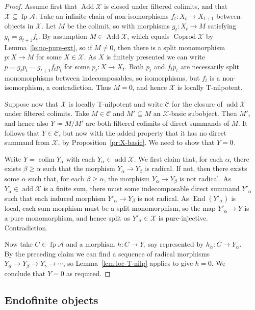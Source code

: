 \documentclass[a4paper]{amsart}
\theoremstyle{plain}
\theoremstyle{definition}
\theoremstyle{remark}
\numberwithin{equation}{section}
\newcommand{\add}{\operatorname{add}}
\newcommand{\Add}{\operatorname{Add}}
\newcommand{\Coprod}{\operatorname{Coprod}}
\newcommand{\colim}{\operatorname*{colim}}
\newcommand{\End}{\operatorname{End}}
\newcommand{\fp}{\operatorname{fp}}
\def\A{\mathcal A}
\def\X{\mathcal X}
\begin{document}
\begin{proof}
Assume first that $\Add\X$ is closed under filtered colimits, and that $\X\subseteq\fp\A$. Take an infinite chain of non-isomorphisms $f_t\colon X_t\to X_{t+1}$ between objects in $\X$. Let $M$ be the colimit, so with morphisms $g_t\colon X_t\to M$ satisfying $g_t=g_{t+1}f_t$. By assumption $M\in\Add\X$, which equals $\Coprod\X$ by Lemma~\ref{le:no-pure-ext}, so if $M\neq0$, then there is a split monomorphism $p\colon X\to M$ for some $X\in\X$. As $X$ is finitely presented we can write $p=g_tp_t=g_{t+1}f_tp_t$ for some $p_t\colon X\to X_t$. Both $p_t$ and $f_tp_t$ are necessarily split monomorphisms between indecomposables, so isomorphisms, but $f_t$ is a non-isomorphism, a contradiction. Thus $M=0$, and hence $\X$ is locally T-nilpotent.

Suppose now that $\X$ is locally T-nilpotent and write $\mathcal C$ for the closure of $\add\X$ under filtered colimits. Take $M\in\mathcal C$ and $M'\subseteq M$ an $\X$-basic subobject. Then $M'$, and hence also $Y\coloneqq M/M'$ are both filtered colimits of direct summands of $M$. It follows that $Y\in\mathcal C$, but now with the added property that it has no direct summand from $\X$, by Proposition~\ref{pr:X-basic}. We need to show that $Y=0$.

Write $Y=\colim Y_\alpha$ with each $Y_\alpha\in\add\X$. We first claim that, for each $\alpha$, there exists $\beta\geq\alpha$ such that the morphism $Y_\alpha\to Y_\beta$ is radical. If not, then there exists some $\alpha$ such that, for each $\beta\geq\alpha$, the morphism $Y_\alpha\to Y_\beta$ is not radical. As $Y_\alpha\in\add\X$ is a finite sum, there must some indecomposable direct summand $Y'_\alpha$ such that each induced morphism $Y'_\alpha\to Y_\beta$ is not radical. As $\End(Y'_\alpha)$ is local, each sum morphism must be a split monomorphism, so the map $Y'_\alpha\to Y$ is a pure monomorphism, and hence split as $Y'_\alpha\in\X$ is pure-injective. Contradiction.

Now take $C\in\fp\A$ and a morphism $h\colon C\to Y$, say represented by $h_\alpha\colon C\to Y_\alpha$. By the preceding claim we can find a sequence of radical morphisms $Y_\alpha\to Y_\beta\to Y_\gamma\to\cdots$, so Lemma~\ref{lem:loc-T-nilp} applies to give $h=0$. We conclude that $Y=0$ as required.
\end{proof}



\subsection*{Endofinite objects}
\end{document}

